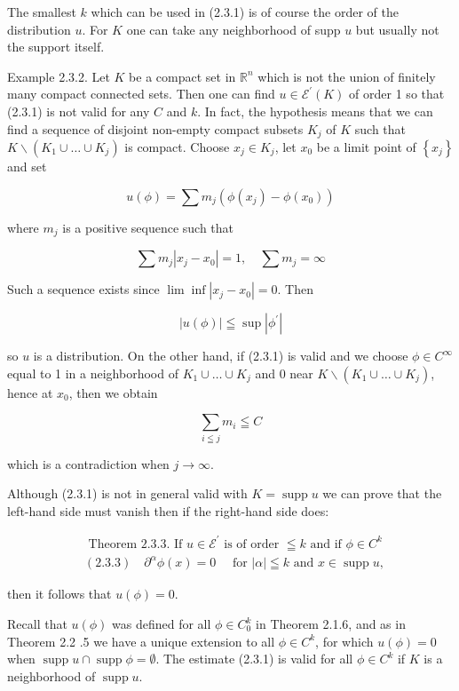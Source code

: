 The smallest $k$ which can be used in (2.3.1) is of course the order of the distribution $u$. For $K$ one can take any neighborhood of supp $u$ but usually not the support itself.

Example 2.3.2. Let $K$ be a compact set in $\mathbb{R}^{n}$ which is not the union of finitely many compact connected sets. Then one can find $u \in \mathscr{E}^{\prime}(K)$ of order 1 so that (2.3.1) is not valid for any $C$ and $k$. In fact, the hypothesis means that we can find a sequence of disjoint non-empty compact subsets $K_{j}$ of $K$ such that $K \backslash\left(K_{1} \cup \ldots \cup K_{j}\right)$ is compact. Choose $x_{j} \in K_{j}$, let $x_{0}$ be a limit point of $\left\{x_{j}\right\}$ and set

\[
u(\phi)=\sum m_{j}\left(\phi\left(x_{j}\right)-\phi\left(x_{0}\right)\right)
\]

where $m_{j}$ is a positive sequence such that

\[
\sum m_{j}\left|x_{j}-x_{0}\right|=1, \quad \sum m_{j}=\infty
\]

Such a sequence exists since $\lim \inf \left|x_{j}-x_{0}\right|=0$. Then

\[
|u(\phi)| \leqq \sup \left|\phi^{\prime}\right|
\]

so $u$ is a distribution. On the other hand, if (2.3.1) is valid and we choose $\phi \in C^{\infty}$ equal to 1 in a neighborhood of $K_{1} \cup \ldots \cup K_{j}$ and 0 near $K \backslash\left(K_{1} \cup \ldots \cup K_{j}\right)$, hence at $x_{0}$, then we obtain

\[
\sum_{i \leqq j} m_{i} \leqq C
\]

which is a contradiction when $j \rightarrow \infty$.

Although (2.3.1) is not in general valid with $K=\operatorname{supp} u$ we can prove that the left-hand side must vanish then if the right-hand side does:

\[
\begin{aligned}
& \text { Theorem 2.3.3. If } u \in \mathscr{E}^{\prime} \text { is of order } \leqq k \text { and if } \phi \in C^{k} \\
& (2.3 .3) \quad \partial^{\alpha} \phi(x)=0 \quad \text { for }|\alpha| \leqq k \text { and } x \in \operatorname{supp} u \text {, }
\end{aligned}
\]

then it follows that $u(\phi)=0$.

Recall that $u(\phi)$ was defined for all $\phi \in C_{0}^{k}$ in Theorem 2.1.6, and as in Theorem 2.2 .5 we have a unique extension to all $\phi \in C^{k}$, for which $u(\phi)=0$ when $\operatorname{supp} u \cap \operatorname{supp} \phi=\emptyset$. The estimate (2.3.1) is valid for all $\phi \in C^{k}$ if $K$ is a neighborhood of $\operatorname{supp} u$.

